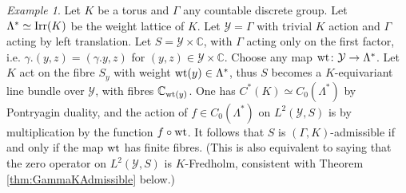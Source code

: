 \documentclass[11pt,reqno]{amsart}
\theoremstyle{definition}
\theoremstyle{remark}
\newtheorem{example}[theorem]{Example}
\newcommand{\tn}[1]{\textnormal{#1}}
\def\Y{\ensuremath{\mathcal{Y}}}
\def\bC{\ensuremath{\mathbb{C}}}
\def\wt{\ensuremath{\textnormal{wt}}}
\def\Irr{\ensuremath{\tn{Irr}}}
\begin{document}
\begin{example}
\label{ex:Disconnected}
Let $K$ be a torus and $\Gamma$ any countable discrete group.  Let $\Lambda^\ast \simeq \Irr(K)$ be the weight lattice of $K$.  Let $\Y=\Gamma$ with trivial $K$ action and $\Gamma$ acting by left translation.  Let $S=\Y \times \bC$, with $\Gamma$ acting only on the first factor, i.e. $\gamma.(y,z)=(\gamma.y,z)$ for $(y,z) \in \Y \times \bC$.  Choose any map $\tn{wt} \colon \Y \rightarrow \Lambda^\ast$.  Let $K$ act on the fibre $S_y$ with weight $\tn{wt}(y) \in \Lambda^\ast$, thus $S$ becomes a $K$-equivariant line bundle over $\Y$, with fibres $\bC_{\tn{wt}(y)}$.  One has $C^\ast(K)\simeq C_0(\Lambda^\ast)$ by Pontryagin duality, and the action of $f \in C_0(\Lambda^\ast)$ on $L^2(\Y,S)$ is by multiplication by the function $f\circ \tn{wt}$.  It follows that $S$ is $(\Gamma,K)$-admissible if and only if the map $\wt$ has finite fibres.  (This is also equivalent to saying that the zero operator on $L^2(\Y,S)$ is $K$-Fredholm, consistent with Theorem \ref{thm:GammaKAdmissible} below.)
\end{example}
\end{document}
